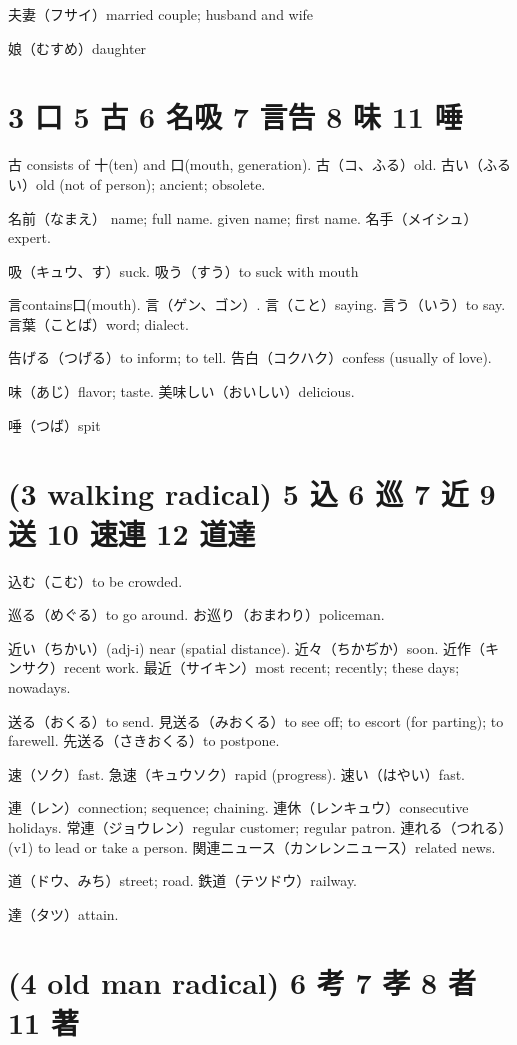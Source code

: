 夫妻（フサイ）married couple; husband and wife

娘（むすめ）daughter

\section{3 口 5 古 6 名吸 7 言告 8 味 11 唾}

古 consists of 十(ten) and 口(mouth, generation).
古（コ、ふる）old.
古い（ふるい）old (not of person); ancient; obsolete.

名前（なまえ）
name; full name.
given name; first name.
名手（メイシュ）expert.

吸（キュウ、す）suck.
吸う（すう）to suck with mouth

言contains口(mouth).
言（ゲン、ゴン）.
言（こと）saying.
言う（いう）to say.
言葉（ことば）word; dialect.

告げる（つげる）to inform; to tell.
告白（コクハク）confess (usually of love).

味（あじ）flavor; taste.
美味しい（おいしい）delicious.

唾（つば）spit

\section{(3 walking radical) 5 込 6 巡 7 近 9 送 10 速連 12 道達}

込む（こむ）to be crowded.

巡る（めぐる）to go around.
お巡り（おまわり）policeman.

近い（ちかい）(adj-i) near (spatial distance).
近々（ちかぢか）soon.
近作（キンサク）recent work.
最近（サイキン）most recent; recently; these days; nowadays.

送る（おくる）to send.
見送る（みおくる）to see off; to escort (for parting); to farewell.
先送る（さきおくる）to postpone.

速（ソク）fast.
急速（キュウソク）rapid (progress).
速い（はやい）fast.

連（レン）connection; sequence; chaining.
連休（レンキュウ）consecutive holidays.
常連（ジョウレン）regular customer; regular patron.
連れる（つれる）(v1) to lead or take a person.
関連ニュース（カンレンニュース）related news.

道（ドウ、みち）street; road.
鉄道（テツドウ）railway.

達（タツ）attain.

\section{(4 old man radical) 6 考 7 孝 8 者 11 著}

